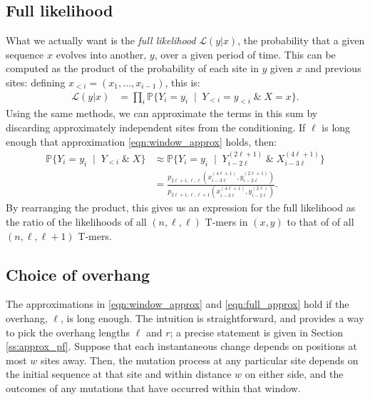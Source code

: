 \documentclass{article}
\renewcommand{\P}{\mathbb{P}}
\newcommand{\calS}{\mathcal{S}}  %
\newcommand{\given}{\;\mid\;}
\newcommand{\like}{\mathcal L}
\theoremstyle{plain}
\theoremstyle{definition}
\begin{document}
\subsection{Full likelihood}

What we actually want is the \emph{full likelihood} $\like(y|x)$,
the probability that a given sequence $x$ evolves into another, $y$, over a given period of time.
This can be computed as the product of the probability of each site in $y$ given $x$ and previous sites:
defining $x_{<i}=(x_1, \ldots, x_{i-1})$, this is:
\begin{align*}
    \like(y|x) &= \prod_i \P\{ Y_i = y_i \given Y_{<i} = y_{<i} \;\&\; X=x \} .
\end{align*}
Using the same methods, we can approximate the terms in this sum
by discarding approximately independent sites from the conditioning.
If $\ell$ is long enough that approximation \eqref{eqn:window_approx} holds, then:
\begin{align} \label{eqn:full_approx}
    \P\{ Y_i = y_i \given Y_{<i} \;\&\; X \} 
    &\approx
        \P\{ Y_i = y_i \given Y_{i-2\ell}^{(2\ell+1)} \;\&\; X_{i-3\ell}^{(4\ell+1)} \}  \\
    &=
        \frac{
            p_{2\ell+1,\ell,\ell}(x_{i-3\ell}^{(4\ell+1)}, y_{i-2\ell}^{(2\ell+1)})
        }{
            p_{2\ell+1,\ell,\ell+1}(x_{i-3\ell}^{(4\ell+1)}, y_{i-2\ell}^{(2\ell)})
        } .
\end{align}
By rearranging the product, 
this gives us an expression for the full likelihood as the ratio of the likelihoods of all $(n,\ell,\ell)$ T-mers in $(x,y)$
to that of of all $(n,\ell,\ell+1)$ T-mers.

\subsection{Choice of overhang}

The approximations in \eqref{eqn:window_approx} and \eqref{eqn:full_approx} hold if the overhang, $\ell$, is long enough.
The intuition is straightforward, and provides a way to pick the overhang lengths $\ell$ and $r$;
a precise statement is given in Section \ref{ss:approx_pf}.
Suppose that each instantaneous change depends on positions at most $w$ sites away.
Then, the mutation process at any particular site
depends on the initial sequence at that site and within distance $w$ on either side, 
and the outcomes of any mutations that have occurred within that window.
\end{document}
